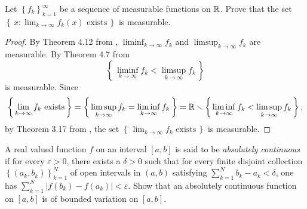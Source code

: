 \begin{problem}
Let $\left\{f_k\right\}_{k=1}^\infty$ be a sequence of measurable functions
on $\mathbb{R}$. Prove that the set
$\left\{\,x:\text{$\lim_{k\to\infty} f_k(x)$ exists}\,\right\}$
is measurable.
\end{problem}
\begin{proof}
By Theorem 4.12 from \cite[Ch.\@ 4, p.\@
67]{wheeden-zygmund}, $\liminf_{k\to\infty}f_k$ and
$\limsup_{k\to\infty}f_k$ are measurable. By Theorem 4.7 from \cite[Ch.\@ 4,
p.\@ 66]{wheeden-zygmund}
\begin{equation}
\label{eq:prep:1:12}
\left\{\,\liminf_{k\to\infty} f_k<\limsup_{k\to\infty} f_k\,\right\}
\end{equation}
is measurable. Since
\begin{equation}
  \label{eq:prep:1:13}
\left\{\,\text{$\lim_{k\to\infty}f_k$ exists}\,\right\}=
\left\{\,{\limsup_{k\to\infty}f_k=\liminf_{k\to\infty}f_k}\,\right\}=
\mathbb{R}\smallsetminus
\left\{\,{\liminf_{k\to\infty} f_k<\limsup_{k\to\infty} f_k}\,\right\},
\end{equation}
by Theorem 3.17 from \cite[Ch.\@ 3, p.\@ 48]{wheeden-zygmund},
the set $\left\{\,\text{$\lim_{k\to\infty}f_k$ exists}\,\right\}$ is
measurable.
\end{proof}
\begin{problem}
A real valued function $f$ on an interval $[a,b]$ is said to be
\emph{absolutely continuous} if for every $\varepsilon>0$, there exists a
$\delta>0$ such that for every finite disjoint collection
$\left\{(a_k,b_k)\right\}_{k=1}^N$ of open intervals in $(a,b)$ satisfying
$\sum_{k=1}^Nb_k-a_k<\delta$, one has
$\sum_{k=1}^N\left|f(b_k)-f(a_k)\right|<\varepsilon$. Show that an
absolutely continuous function on $[a,b]$ is of bounded variation on
$[a,b]$.
\end{problem}
